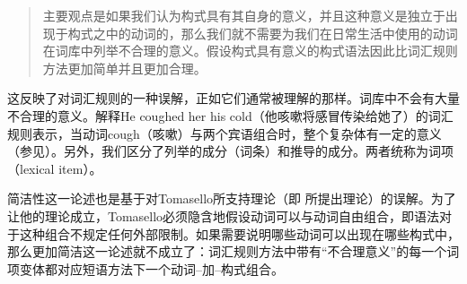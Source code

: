 \begin{quotation}
主要观点是如果我们认为构式具有其自身的意义，并且这种意义是独立于出现于构式之中的动词的，那么我们就不需要为我们在日常生活中使用的动词在词库中列举不合理的意义。假设构式具有意义的构式语法因此比词汇规则方法更加简单并且更加合理。\citep[]{Tomasello2003a}
\end{quotation}

\noindent
这反映了对词汇规则的一种误解，正如它们通常被理解的那样。词库中不会有大量不合理的意义。解释He coughed her his cold（他咳嗽将感冒传染给她了）的词汇规则表示，当动词cough（咳嗽）与两个宾语组合时，整个复杂体有一定的意义（参见\citealp[]{Mueller2006d}）。另外，我们区分了列举的成分（词条）和推导的成分。两者统称为词项（lexical item）。

    简洁性这一论述也是基于对Tomasello所支持理论（即 \citet{Goldberg95a, Goldberg2006a}所提出理论）的误解。为了让他的理论成立，Tomasello必须隐含地假设动词可以与动词自由组合，即语法对于这种组合不规定任何外部限制。如果需要说明哪些动词可以出现在哪些构式中，那么更加简洁这一论述就不成立了：词汇规则方法中带有“不合理意义”的每一个词项变体都对应短语方法下一个动词--加--构式组合。

